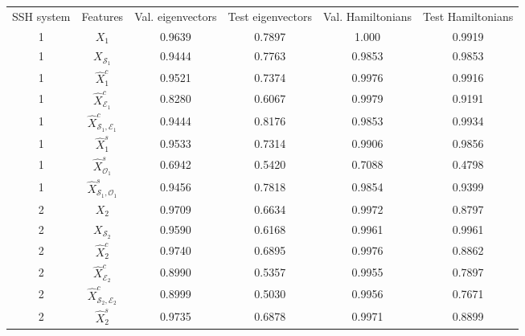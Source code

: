 \documentclass[10pt]{revtex4-1}
\newcommand{\tableRow}[1]{\\[#1 cm]}
\newcommand{\tableRowHeader}[1]{\\[#1 cm]}
\newcommand\tableRowHeaderEnd{\tableRowHeader{0.3}}
\newcommand\tableRowEnd{\tableRow{0.15}}
\newcommand\SSHSys{SSH system}
\newcommand\Feat{Features}
\newcommand\ValEig{Val. eigenvectors}
\newcommand\TestEig{Test eigenvectors}
\newcommand\ValHam{Val. Hamiltonians}
\newcommand\TestHam{Test Hamiltonians}
\newcommand\xOne{$X_1$}
\newcommand\xOneEigVal{0.9639}
\newcommand\xOneEigTest{0.7897}
\newcommand\xOneHamVal{1.000}
\newcommand\xOneHamTest{0.9919}
\newcommand\xSOne{$X_{\mathcal{S}_1}$}
\newcommand\xSOneEigVal{0.9444}
\newcommand\xSOneEigTest{0.7763}
\newcommand\xSOneHamVal{0.9853}
\newcommand\xcOne{$\hat{X}^c_1$}
\newcommand\xcOneEigVal{0.9521}
\newcommand\xcOneEigTest{0.7374}
\newcommand\xcOneHamVal{0.9976}
\newcommand\xcOneHamTest{0.9916}
\newcommand\xcEOne{$\hat{X}^c_{\mathcal{E}_1}$}
\newcommand\xcEOneEigVal{0.8280}
\newcommand\xcEOneEigTest{0.6067}
\newcommand\xcEOneHamVal{0.9979}
\newcommand\xcEOneHamTest{0.9191}
\newcommand\xcSEOne{$\hat{X}^c_{\mathcal{S}_1,\mathcal{E}_1}$}
\newcommand\xcSEOneEigVal{0.9444}
\newcommand\xcSEOneEigTest{0.8176}
\newcommand\xcSEOneHamVal{0.9853}
\newcommand\xcSEOneHamTest{0.9934}
\newcommand\xsOne{$\hat{X}^s_1$}
\newcommand\xsOneEigVal{0.9533}
\newcommand\xsOneEigTest{0.7314}
\newcommand\xsOneHamVal{0.9906}
\newcommand\xsOneHamTest{0.9856}
\newcommand\xsOOne{$\hat{X}^s_{\mathcal{O}_1}$}
\newcommand\xsOOneEigVal{0.6942}
\newcommand\xsOOneEigTest{0.5420}
\newcommand\xsOOneHamVal{0.7088}
\newcommand\xsOOneHamTest{0.4798}
\newcommand\xsSOOne{$\hat{X}^s_{\mathcal{S}_1,\mathcal{O}_1}$}
\newcommand\xsSOOneEigVal{0.9456}
\newcommand\xsSOOneEigTest{0.7818}
\newcommand\xsSOOneHamVal{0.9854}
\newcommand\xsSOOneHamTest{0.9399}
\newcommand\xTwo{$X_2$}
\newcommand\xTwoEigVal{0.9709}
\newcommand\xTwoEigTest{0.6634}
\newcommand\xTwoHamVal{0.9972}
\newcommand\xTwoHamTest{0.8797}
\newcommand\xSTwo{$X_{\mathcal{S}_2}$}
\newcommand\xSTwoEigVal{0.9590}
\newcommand\xSTwoEigTest{0.6168}
\newcommand\xSTwoHamVal{0.9961}
\newcommand\xcTwo{$\hat{X}^c_2$}
\newcommand\xcTwoEigVal{0.9740}
\newcommand\xcTwoEigTest{0.6895}
\newcommand\xcTwoHamVal{0.9976}
\newcommand\xcTwoHamTest{0.8862}
\newcommand\xcETwo{$\hat{X}^c_{\mathcal{E}_2}$}
\newcommand\xcETwoEigVal{0.8990}
\newcommand\xcETwoEigTest{0.5357}
\newcommand\xcETwoHamVal{0.9955}
\newcommand\xcETwoHamTest{0.7897}
\newcommand\xcSETwo{$\hat{X}^c_{\mathcal{S}_2,\mathcal{E}_2}$}
\newcommand\xcSETwoEigVal{0.8999}
\newcommand\xcSETwoEigTest{0.5030}
\newcommand\xcSETwoHamVal{0.9956}
\newcommand\xcSETwoHamTest{0.7671}
\newcommand\xsTwo{$\hat{X}^s_2$}
\newcommand\xsTwoEigVal{0.9735}
\newcommand\xsTwoEigTest{0.6878}
\newcommand\xsTwoHamVal{0.9971}
\newcommand\xsTwoHamTest{0.8899}
\begin{document}
\begin{table}
\begin{tabular}{||c@{\hskip 0.3in} c@{\hskip 0.3in} c@{\hskip 0.3in} c@{\hskip 0.3in} c@{\hskip 0.3in} c||} 
\hline
\SSHSys               &\Feat             &\ValEig            &\TestEig           &\ValHam              &\TestHam         \tableRowHeaderEnd 
1                     &\xOne             &\xOneEigVal        &\xOneEigTest       &\xOneHamVal          &\xOneHamTest       \tableRowEnd
1                     &\xSOne            &\xSOneEigVal       &\xSOneEigTest      &\xSOneHamVal         &\xSOneHamVal       \tableRowEnd
1                     &\xcOne            &\xcOneEigVal       &\xcOneEigTest      &\xcOneHamVal         &\xcOneHamTest      \tableRowEnd
1                     &\xcEOne           &\xcEOneEigVal      &\xcEOneEigTest     &\xcEOneHamVal        &\xcEOneHamTest     \tableRowEnd
1                     &\xcSEOne          &\xcSEOneEigVal     &\xcSEOneEigTest    &\xcSEOneHamVal       &\xcSEOneHamTest    \tableRowEnd
1                     &\xsOne            &\xsOneEigVal       &\xsOneEigTest      &\xsOneHamVal         &\xsOneHamTest      \tableRowEnd
1                     &\xsOOne           &\xsOOneEigVal      &\xsOOneEigTest     &\xsOOneHamVal        &\xsOOneHamTest     \tableRowEnd
1                     &\xsSOOne          &\xsSOOneEigVal     &\xsSOOneEigTest    &\xsSOOneHamVal       &\xsSOOneHamTest    \tableRowEnd
2                     &\xTwo             &\xTwoEigVal        &\xTwoEigTest       &\xTwoHamVal          &\xTwoHamTest       \tableRowEnd
2                     &\xSTwo            &\xSTwoEigVal       &\xSTwoEigTest      &\xSTwoHamVal         &\xSTwoHamVal       \tableRowEnd
2                     &\xcTwo            &\xcTwoEigVal       &\xcTwoEigTest      &\xcTwoHamVal         &\xcTwoHamTest      \tableRowEnd
2                     &\xcETwo           &\xcETwoEigVal      &\xcETwoEigTest     &\xcETwoHamVal        &\xcETwoHamTest     \tableRowEnd
2                     &\xcSETwo          &\xcSETwoEigVal     &\xcSETwoEigTest    &\xcSETwoHamVal       &\xcSETwoHamTest    \tableRowEnd
2                     &\xsTwo            &\xsTwoEigVal       &\xsTwoEigTest      &\xsTwoHamVal         &\xsTwoHamTest      \tableRowEnd

\end{tabular}
\end{table}
\end{document}
